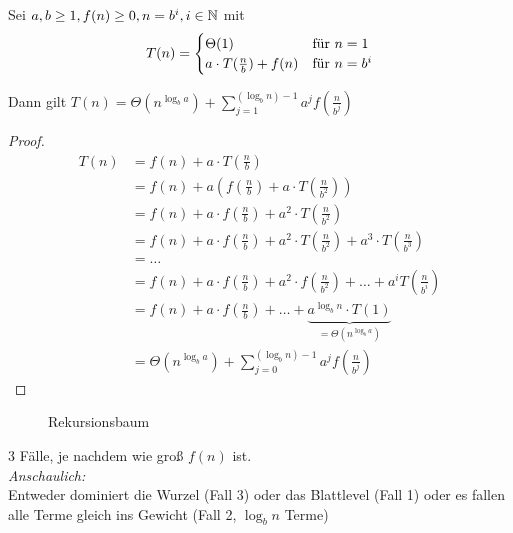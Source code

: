 \begin{lemma} 
Sei $a,b \geq 1, f(n) \geq 0, n=b^i, i \in \mathbb{N}$ mit 
$$
T(n) = 
\begin{cases} 
\Theta (1) 					& \text{\normalfont für } n=1 \\ 
a \cdot T(\frac{n}{b}) + f(n) 	& \text{\normalfont für } n=b^i 
\end{cases}
$$

Dann gilt $T(n) = \Theta (n^{\log_b a}) + \sum \limits_{j=1}^{(\log_b n)-1} a^j f(\frac{n}{b^j})$

\begin{proof}
\begin{align*} 
T\left(n\right) &= f\left(n\right) + a \cdot T\left(\frac{n}{b}\right) \\
&= f\left(n\right) + a \left(f\left(\frac{n}{b}\right) + a \cdot T\left( \frac{n}{b^2}\right)\right) \\
&= f\left(n\right) + a \cdot f\left(\frac{n}{b}\right) + a^2 \cdot T\left(\frac{n}{b^2}\right) \\
&= f\left(n\right) + a \cdot f\left(\frac{n}{b}\right) 
+ a^2 \cdot T\left(\frac{n}{b^2}\right) + a^3 \cdot T\left(\frac{n}{b^3}\right) \\
&= \dots \\
&= f\left(n\right) + a \cdot f\left(\frac{n}{b}\right) + a^2 \cdot f\left(\frac{n}{b^2}\right) 
+ \ldots + a^i T\left(\frac{n}{b^i}\right) \\
&= f\left(n\right) + a \cdot f\left(\frac{n}{b}\right) + \ldots + \underbrace{a^{\log_b n} 
\cdot T\left(1\right)}_{=  \Theta\left(n^{\log_b a}\right)} \\
&= \Theta\left(n^{\log_b a}\right) 
+ \sum \limits_{j=0}^{\left(\log_b n\right)-1} a^j f\left(\frac{n}{b^j}\right)
\end{align*}
\end{proof}
\end{lemma}
\begin{figure}[htp]
\centering

\caption{Rekursionsbaum} %
\label{diag1:recursion-tree}
\end{figure}
3 Fälle, je nachdem wie groß $f(n)$ ist. \\
\textit{Anschaulich:}\\
Entweder dominiert die Wurzel (Fall 3) oder das Blattlevel (Fall 1) 
oder es fallen alle Terme gleich ins Gewicht (Fall 2, $\log_b n$ Terme) 
